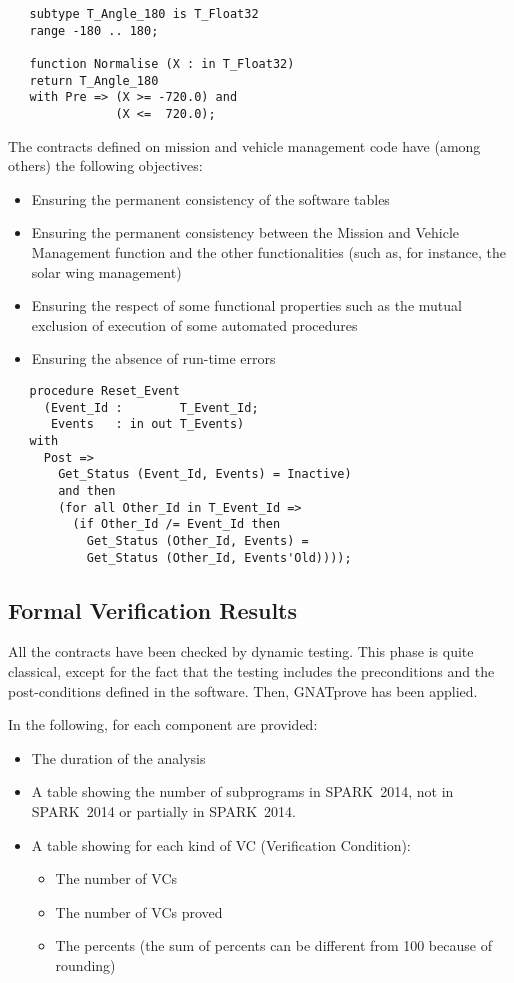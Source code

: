 \documentclass[10pt,a4paper,twocolumn]{article}
\newcommand{\gnatprove}{GNATprove\xspace}
\newcommand{\newspark}{SPARK~2014\xspace}
\begin{document}
\begin{lstlisting}
   subtype T_Angle_180 is T_Float32
   range -180 .. 180;

   function Normalise (X : in T_Float32)
   return T_Angle_180
   with Pre => (X >= -720.0) and
               (X <=  720.0);
\end{lstlisting}

The contracts defined on mission and vehicle management code have (among others) the following objectives:

\begin{itemize}
\item Ensuring the permanent consistency of the software tables
\item Ensuring the permanent consistency between the Mission and Vehicle Management function and the other functionalities (such as, for instance, the solar wing management)
\item Ensuring the respect of some functional properties such as the mutual exclusion of execution of some automated procedures
\item Ensuring the absence of run-time errors
\end{itemize}

\begin{lstlisting}
   procedure Reset_Event
     (Event_Id :        T_Event_Id;
      Events   : in out T_Events)
   with
     Post =>
       Get_Status (Event_Id, Events) = Inactive)
       and then
       (for all Other_Id in T_Event_Id =>
         (if Other_Id /= Event_Id then
           Get_Status (Other_Id, Events) =
           Get_Status (Other_Id, Events'Old))));
\end{lstlisting}

\subsection{Formal Verification Results}

All the contracts have been checked by dynamic testing. This phase is quite classical, except for the fact that the testing includes the preconditions and the post-conditions defined in the software. Then, \gnatprove has been applied.

In the following, for each component are provided:

\begin{itemize}
\item The duration of the analysis
\item A table showing the number of subprograms in \newspark, not in \newspark or partially in \newspark.
\item A table showing for each kind of VC (Verification Condition):

\begin{itemize}
\item The number of VCs
\item The number of VCs proved
\item The percents (the sum of percents can be different from 100 because of rounding)
\end{itemize}
\end{itemize}
\end{document}
